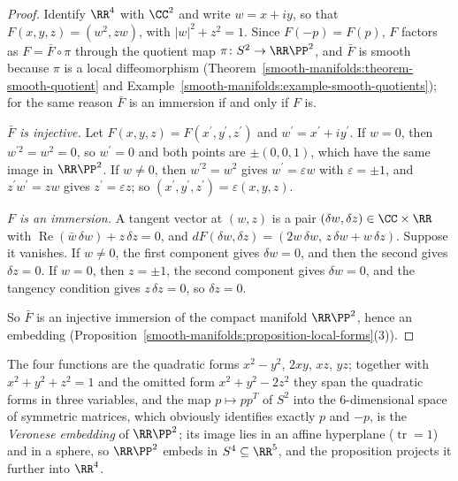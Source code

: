 \begin{proof}
Identify $\RR^4$ with $\CC^2$ and write $w = x + iy$, so that $F(x, y, z) = (w^2, zw)$, with $|w|^2 + z^2 = 1$. Since $F(-p) = F(p)$, $F$ factors as $F = \bar F \circ \pi$ through the quotient map $\pi \colon S^2 \to \RR\PP^2$,
and $\bar F$ is smooth because $\pi$ is a local diffeomorphism (Theorem~\ref{smooth-manifolds:theorem-smooth-quotient} and Example~\ref{smooth-manifolds:example-smooth-quotients}); for the same reason
$\bar F$ is an immersion if and only if $F$ is.

\emph{$\bar F$ is injective.} Let $F(x, y, z) = F(x^{\prime}, y^{\prime}, z^{\prime})$ and $w^{\prime} = x^{\prime} + iy^{\prime}$. If $w = 0$, then $w^{\prime2} = w^2 = 0$, so $w^{\prime} = 0$ and both points are $\pm(0, 0, 1)$, which have the same
image in $\RR\PP^2$. If $w \neq 0$, then $w^{\prime2} = w^2$ gives $w^{\prime} = \varepsilon w$ with $\varepsilon = \pm1$, and $z^{\prime}w^{\prime} = zw$ gives $z^{\prime} = \varepsilon z$; so $(x^{\prime}, y^{\prime}, z^{\prime}) = \varepsilon(x, y, z)$.

\emph{$F$ is an immersion.} A tangent vector at $(w, z)$ is a pair $(\delta w, \delta z) \in \CC \times \RR$ with $\operatorname{Re}(\bar w\,\delta w) + z\,\delta z = 0$, and $dF(\delta w, \delta z) = (2w\,\delta w, \, z\,\delta w + w\,\delta z)$. Suppose
it vanishes. If $w \neq 0$, the first component gives $\delta w = 0$, and then the second gives $\delta z = 0$. If $w = 0$, then $z = \pm1$, the second component gives $\delta w = 0$, and the tangency condition gives
$z\,\delta z = 0$, so $\delta z = 0$.

So $\bar F$ is an injective immersion of the compact manifold $\RR\PP^2$, hence an embedding (Proposition~\ref{smooth-manifolds:proposition-local-forms}(3)).
\end{proof}

The four functions are the quadratic forms $x^2 - y^2$, $2xy$, $xz$, $yz$; together with $x^2 + y^2 + z^2 = 1$ and the omitted form $x^2 + y^2 - 2z^2$ they span the quadratic forms in three variables, and the map
$p \mapsto pp^T$ of $S^2$ into the $6$-dimensional space of symmetric matrices, which obviously identifies exactly $p$ and $-p$, is the \emph{Veronese embedding} of $\RR\PP^2$; its image lies in an affine hyperplane
($\operatorname{tr} = 1$) and in a sphere, so $\RR\PP^2$ embeds in $S^4 \subseteq \RR^5$, and the proposition projects it further into $\RR^4$.

